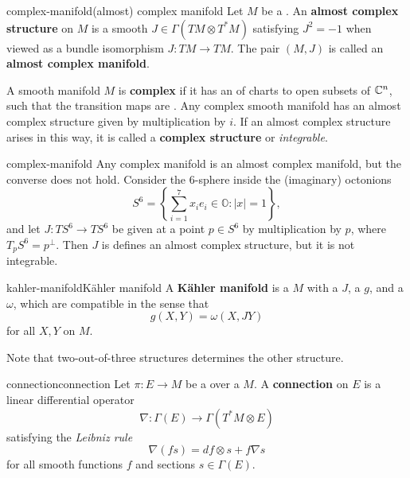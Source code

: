 \begin{topic}{complex-manifold}{(almost) complex manifold}
    Let $M$ be a . An \textbf{almost complex structure} on $M$ is a smooth  $J \in \Gamma(TM \otimes T^*M)$ satisfying $J^2 = -1$ when viewed as a bundle isomorphism $J : TM \to TM$. The pair $(M, J)$ is called an \textbf{almost complex manifold}.
    
    A smooth manifold $M$ is \textbf{complex} if it has an  of charts to open subsets of $\mathbb{C}^n$, such that the transition maps are . Any complex smooth manifold has an almost complex structure given by multiplication by $i$. If an almost complex structure arises in this way, it is called a \textbf{complex structure} or \textit{integrable}.
 \end{topic}
 
 \begin{example}{complex-manifold}
    Any complex manifold is an almost complex manifold, but the converse does not hold. Consider the $6$-sphere inside the (imaginary) octonions
     \[ S^6 = \left\{ \sum_{i = 1}^{7} x_i e_i \in \mathbb{O} : |x| = 1 \right\} , \]
     and let $J : TS^6 \to TS^6$ be given at a point $p \in S^6$ by multiplication by $p$, where $T_p S^6 = p^\perp$. Then $J$ is defines an almost complex structure, but it is not integrable.
 \end{example}

\begin{topic}{kahler-manifold}{Kähler manifold}
    A \textbf{Kähler manifold} is a  $M$ with a  $J$, a  $g$, and a  $\omega$, which are compatible in the sense that
    \[ g(X, Y) = \omega(X, JY) \]
    for all  $X, Y$ on $M$.
    
    Note that two-out-of-three structures determines the other structure.
\end{topic}

\begin{topic}{connection}{connection}
    Let $\pi : E \to M$ be a  over a  $M$. A \textbf{connection} on $E$ is a linear differential operator
    \[ \nabla : \Gamma(E) \to \Gamma(T^*M \otimes E) \]
    satisfying the \textit{Leibniz rule}
    \[ \nabla(fs) = df \otimes s + f \nabla s \]
    for all smooth functions $f$ and sections $s \in \Gamma(E)$.
\end{topic}

